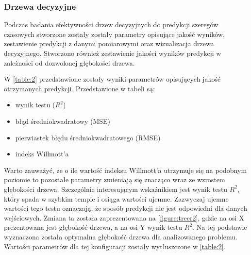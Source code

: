 \documentclass[10pt,a4paper]{article}
\begin{document}
\subsubsection{Drzewa decyzyjne}
Podczas badania efektywności drzew decyzyjnych do predykcji szeregów czasowych stworzone zostały zostały parametry opisujące jakość wyników, zestawienie predykcji z danymi pomiarowymi oraz wizualizacja drzewa decyzyjnego. Stworzono również zestawienie jakości wyników predykcji w zależności od dozwolonej głębokości drzewa. 

W \autoref{table:2} przedstawione zostały wyniki parametrów opisujących jakość otrzymanych predykcji. Przedstawione w tabeli są:
\begin{center}
	\begin{itemize}
		\item wynik testu ($R^2$)
		\item błąd średniokwadratowy (MSE)
		\item pierwiastek błędu średniokwadratowego (RMSE)
		\item indeks Willmott'a
	\end{itemize}
\end{center}
Warto zauważyć, że o ile wartość indeksu Willmott'a utrzymuje się na podobnym poziomie to pozostałe parametry zmieniają się znacząco wraz ze wzrostem głębokości drzewa. Szczególnie interesującym wskaźnikiem jest wynik testu $R^2$, który spada w szybkim tempie i osiąga wartości ujemne. Zazwyczaj ujemne wartości tego testu oznaczają, że sposób predykcji nie jest odpowiedni dla danych wejściowych. Zmiana ta została zaprezentowana na \autoref{figure:treer2}, gdzie na osi X prezentowana jest głębokość drzewa, a na osi Y wynik testu $R^2$. Na tej podstawie wyznaczona została optymalna głębokość drzewa dla analizowanego problemu. Wartości parametrów dla tej konfiguracji zostały wytłuszczone w \autoref{table:2}.
\end{document}
